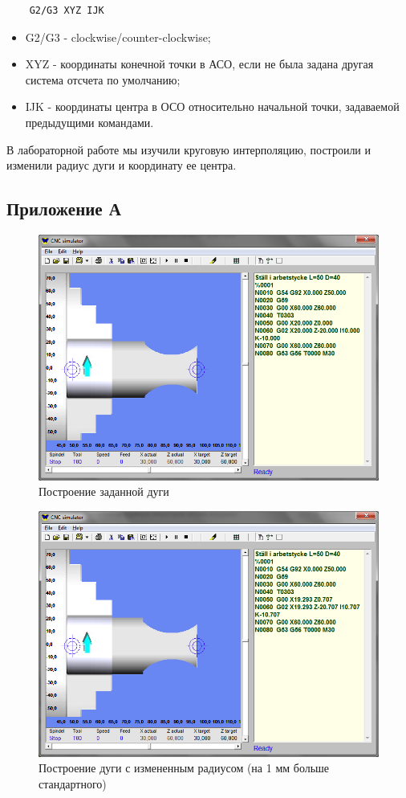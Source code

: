 \begin{verbatim}
    G2/G3 XYZ IJK
\end{verbatim}

\begin{itemize}
    \item G2/G3 - clockwise/counter-clockwise;
    \item XYZ - координаты конечной точки в АСО, если не была задана другая система отсчета по умолчанию;
    \item IJK - координаты центра в ОСО относительно начальной точки, задаваемой предыдущими командами.
\end{itemize}

В лабораторной работе мы изучили круговую интерполяцию, построили и изменили радиус дуги и координату ее центра.

\clearpage

\subsection*{Приложение А}

\begin{figure}[ht]
\centering
	\includegraphics[width=.65\linewidth]{1.png}
    \caption{Построение заданной дуги\label{fig:default}}
\end{figure}

\begin{figure}[ht]
\centering
	\includegraphics[width=.65\linewidth]{2.png}
    \caption{Построение дуги с измененным радиусом (на 1 мм больше стандартного)\label{fig:changed}}
\end{figure}


